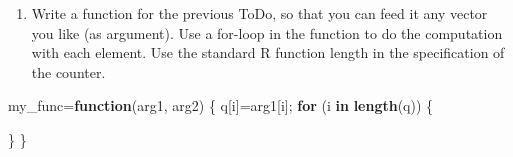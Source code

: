 \documentclass[]{article}
\newenvironment{Shaded}{\begin{snugshade}}{\end{snugshade}}
\newcommand{\KeywordTok}[1]{\textcolor[rgb]{0.13,0.29,0.53}{\textbf{#1}}}
\newcommand{\ControlFlowTok}[1]{\textcolor[rgb]{0.13,0.29,0.53}{\textbf{#1}}}
\newcommand{\NormalTok}[1]{#1}
\providecommand{\tightlist}{%
  \setlength{\itemsep}{0pt}\setlength{\parskip}{0pt}}
\begin{document}
\begin{enumerate}
\def\labelenumi{\arabic{enumi}.}
\setcounter{enumi}{13}
\tightlist
\item
  Write a function for the previous ToDo, so that you can feed it any
  vector you like (as argument). Use a for-loop in the function to do
  the computation with each element. Use the standard R function length
  in the specification of the counter.
\end{enumerate}

\begin{Shaded}
\begin{Highlighting}[]
\NormalTok{my_func=}\ControlFlowTok{function}\NormalTok{(arg1, arg2)}
\NormalTok{\{}
\NormalTok{  q[i]=arg1[i];}
  \ControlFlowTok{for}\NormalTok{ (i }\ControlFlowTok{in} \KeywordTok{length}\NormalTok{(q))}
\NormalTok{  \{}
    
\NormalTok{  \}}
\NormalTok{\}}
\end{Highlighting}
\end{Shaded}
\end{document}
